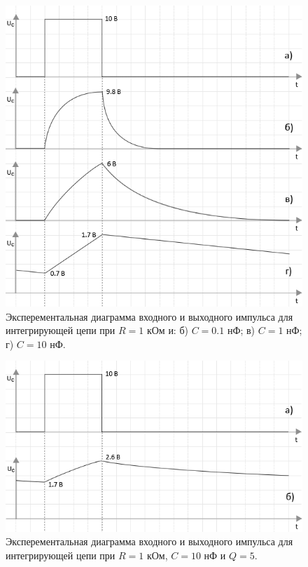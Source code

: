 \begin{figure}[H]
	\begin{center}
		\includegraphics[width=14cm]{img/int}
		\caption{Эксперементальная диаграмма входного и выходного импульса для интегрирующей цепи при $R = 1$ кОм и: б) $C = 0.1$ нФ; в) $C = 1$ нФ; г) $C = 10$ нФ.} 
		\label{t:2} %
	\end{center}
\end{figure}

\begin{figure}[H]
	\begin{center}
		\includegraphics[width=14cm]{img/q5}
		\caption{Эксперементальная диаграмма входного и выходного импульса для интегрирующей цепи при $R = 1$ кОм, $C = 10$ нФ и $Q = 5$.} 
		\label{t:2} %
	\end{center}
\end{figure}

